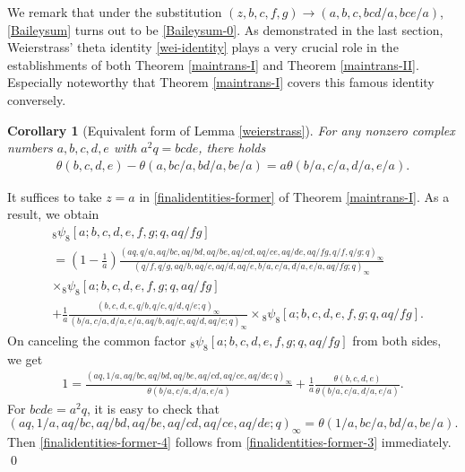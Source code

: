\documentclass[xits,review,sort&compress]{elsarticle}
\newtheorem{tl}[dl]{Corollary}
\numberwithin{equation}{section}
\def\pf{\noindent {\it Proof.} }
\begin{document}
We remark that under the substitution $(z,b,c,f,g)\to (a,b,c,bcd/a,bce/a)$, \eqref{Baileysum} turns out to be \eqref{Baileysum-0}. As demonstrated in the last section, Weierstrass' theta identity \eqref{wei-identity} plays a very crucial role in the establishments of both Theorem \ref{maintrans-I} and Theorem \ref{maintrans-II}.   Especially noteworthy  that Theorem \ref{maintrans-I}   covers this famous identity conversely.
\begin{tl}[Equivalent form of Lemma \ref{weierstrass}]  For any nonzero complex numbers $a,b,c,d,e$ with $a^2q=bcde$, there holds
\begin{align}
\theta(b,c,d,e)-\theta(a,bc/a,bd/a,be/a)=a\theta\left( b/a,c/a,d/a,e/a\right).\label{finalidentities-former-4}
\end{align}
\end{tl}
\pf It suffices to take $z=a$ in \eqref{finalidentities-former} of Theorem \ref{maintrans-I}. As a result, we obtain
 \begin{align*}
 &{}_{8} \psi_{8}\left[a ; b, c, d, e, f, g ; q,aq/ f g\right] \nonumber\\
 &=\left(1-\frac{1}{a}\right)\frac{(aq, q / a, aq/bc,aq/bd,aq/be, aq / c d, aq / c e, aq / d e, aq / f g, q/f, q/g ; q)_{\infty}}{\left(q / f, q / g, aq/b,aq / c, aq / d, aq / e, b / a, c / a, d / a, e/ a, aq/ f g ; q\right)_{\infty}}\nonumber\\
 &\times {}_{8} \psi_{8}[a ; b, c, d, e, f,g ; q, aq / f g]\\
 &+\frac{1}{a}\frac{(b, c, d, e, q/b, q/c, q/d, q/e; q)_{\infty}}{\left( b/a,c/a,d/a,e/a,aq/b,aq/c,aq/d,aq/e;q\right)_{\infty}}
 \times {}_{8}\psi_{8}\left[a ; b, c, d, e, f, g ; q,aq/ f g\right].\nonumber
\end{align*}
On canceling the common factor ${}_{8}\psi_{8}\left[a ; b, c, d, e, f, g ; q,aq/ f g\right]$ from both sides, we get
\begin{align}
 1 =\frac{(aq, 1/ a, aq/bc,aq/bd,aq/be, aq / c d, aq / c e, aq / d e; q)_{\infty}}{\theta\left( b/a,c/a,d/a,e/a\right)}+\frac{1}{a}\frac{\theta(b,c,d,e)}{\theta\left( b/a,c/a,d/a,e/a\right)}
 .
\label{finalidentities-former-3}
\end{align}
For $bcde=a^2q$,  it is easy to check that
$$
(aq, 1/ a, aq/bc,aq/bd,aq/be, aq / c d, aq / c e, aq / d e; q)_{\infty}=\theta(1/a,bc/a,bd/a,be/a).
$$
Then \eqref{finalidentities-former-4} follows from \eqref{finalidentities-former-3} immediately.
\qed
\end{document}
